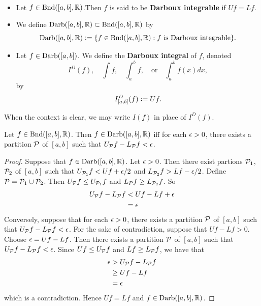 \documentclass{book}
\begin{document}
	\begin{defn}   \\ 
		\begin{itemize}
			\item Let $f \in \text{Bnd}([a,b], \mathbb{R})$.Then $f$ is said to be \textbf{Darboux integrable} if $Uf = Lf$. 
			\item We define $\text{Darb}([a,b], \mathbb{R}) \subset \text{Bnd}([a,b], \mathbb{R})$ by 
			$$\text{Darb}([a,b], \mathbb{R}) \vcentcolon= \{f \in \text{Bnd}([a,b], \mathbb{R}): \text{$f$ is Darboux integrable}\}.$$
			\item Let $f \in \text{Darb}([a,b])$. We define the \textbf{Darboux integral} of $f$, denoted
			$$I^D(f), \quad \int f, \quad  \int_a^b f, \quad \text{or} \quad \int_a^b f(x) dx,$$  
			by
			$$I^D_{[a,b]} (f) \vcentcolon= Uf.$$ 
		\end{itemize}
	\end{defn}
	
	\begin{note}
		When the context is clear, we may write $I(f)$ in place of $I^D(f)$.
	\end{note}
	
	\begin{ex}  
		Let $f \in \text{Bnd}([a,b], \mathbb{R})$. Then $f \in \text{Darb}([a,b], \mathbb{R})$ iff for each $\epsilon >0$, there exists a partition $\mathcal{P}$ of $[a,b]$ such that $U_{\mathcal{P}} f - L_{\mathcal{P}} f < \epsilon$.
	\end{ex}
	
	\begin{proof}
		Suppose that $f \in \text{Darb}([a,b], \mathbb{R})$. Let $\epsilon >0$. Then there exist partions $\mathcal{P}_1$, $\mathcal{P}_2$ of $[a,b]$ such that $U_{\mathcal{P}_1} f < Uf + \epsilon/2$ and $L_{\mathcal{P}_2} f > Lf - \epsilon/2$. Define $\mathcal{P} = \mathcal{P}_1 \cup \mathcal{P}_2$. Then $U_{\mathcal{P}} f \leq U_{\mathcal{P}_1} f$ and $L_P f \geq L_{\mathcal{P}_2}f$. So  
		\begin{align*}
			U_{\mathcal{P}} f - L_{\mathcal{P}} f 
			&< Uf - L f + \epsilon \\
			&= \epsilon
		\end{align*}  
		Conversely, suppose that for each $\epsilon >0$, there exists a partition $\mathcal{P}$ of $[a,b]$ such that $U_{\mathcal{P}} f - L_{\mathcal{P}} f < \epsilon$. For the sake of contradiction, suppose that $Uf - Lf > 0$. Choose $\epsilon = Uf - Lf$. Then there exists a partition $\mathcal{P}$ of $[a,b]$ such that $U_{\mathcal{P}} f - L_{\mathcal{P}} f < \epsilon$. Since $Uf \leq U_{\mathcal{P}} f$ and $Lf \geq L_{\mathcal{P}} f$, we have that 
		\begin{align*}
			\epsilon 
			&> U_{\mathcal{P}} f - L_{\mathcal{P}} f \\
			&\geq Uf - Lf \\
			&= \epsilon
		\end{align*} 
		which is a contradiction. Hence $Uf = Lf$ and $f \in \text{Darb}([a,b], \mathbb{R})$.
	\end{proof}
	
\end{document}
